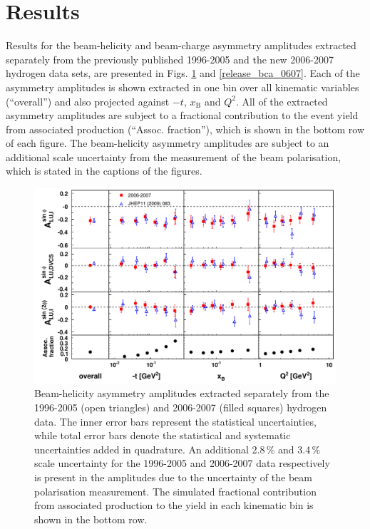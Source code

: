 \section{Results}
Results for the beam-helicity and beam-charge asymmetry amplitudes extracted separately from the previously published 1996-2005 and the new 2006-2007 hydrogen data sets, are presented in Figs. \ref{release_bsa_0607} and \ref{release_bca_0607}. Each of the asymmetry amplitudes is shown extracted in one bin over all kinematic variables (``overall'') and also projected against $-t$, $x_{\textrm{B}}$ and $Q^{2}$. All of the extracted asymmetry amplitudes are subject to a fractional contribution to the event yield from associated production (``Assoc. fraction''), which is shown in the bottom row of each figure. The beam-helicity asymmetry amplitudes are subject to an additional scale uncertainty from the measurement of the beam polarisation, which is stated in the captions of the figures.
\begin{figure}
\begin{center}
\includegraphics[width=15cm,keepaspectratio]{bsadvcsplots_eml_par13_bin6_pic_0607_9605_cluster}
  \caption{Beam-helicity asymmetry amplitudes extracted separately from
the 1996-2005 (open triangles) and 2006-2007 (filled squares)
hydrogen data. The inner error bars represent the statistical uncertainties, while total error bars denote the statistical and systematic uncertainties added in quadrature.  
An additional 2.8\,\% and 3.4\,\% scale uncertainty for the 1996-2005 and
2006-2007 data respectively is present in the amplitudes due to the uncertainty of
the beam polarisation measurement. The simulated fractional contribution from associated production to the yield in each kinematic bin is shown in the bottom row.}
 \label{release_bsa_0607}
\end{center}
 \end{figure}

